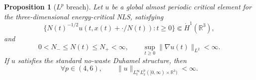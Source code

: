 \documentclass[smallextended,envcountsect,nospthms]{svjour3}
\numberwithin{equation}{section}
\theoremstyle{spbreak}
\newtheorem{proposition}[theorem]{Proposition}
\theoremstyle{spdefbreak}
\theoremstyle{spdefbreak}
\newcommand{\R}{\mathbb R}
\begin{document}
\begin{proposition}[$L^p$ breach]\label{prop:Lp-breach}
Let $u$ be a global almost periodic critical element for the three-dimensional energy-critical NLS, satisfying
\begin{equation*}
  \{N(t)^{-1/2}u(t,x(t)+\cdot/N(t)):t\ge0\}
  \Subset\dot H^1(\R^3),
\end{equation*}
and
\begin{equation*}
  0<N_-\le N(t)\le N_+<\infty,
  \qquad \sup_{t\ge0}\|\nabla u(t)\|_{L^2}<\infty.
\end{equation*}
If $u$ satisfies the standard no-waste Duhamel structure, then
\begin{equation*}
  \forall p\in(4,6),
  \qquad \|u\|_{L_t^\infty L_x^p([0,\infty)\times\R^3)}<\infty.
\end{equation*}
\end{proposition}
\end{document}
